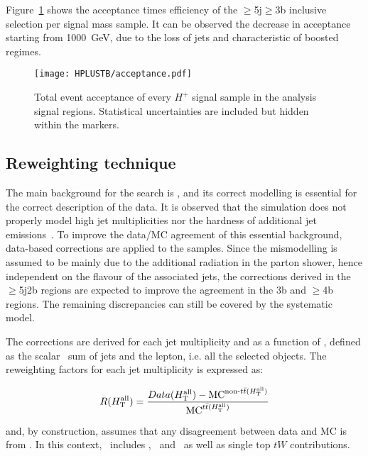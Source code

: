 Figure~\ref{Hplustb:acceptance} shows the acceptance times efficiency of the $\geq$5j$\geq$3b inclusive selection per signal mass sample. It can be observed the decrease in acceptance starting from 1000~GeV, due to the loss of jets and characteristic of boosted regimes.

\begin{figure}[htbp]
    \RawFloats
    \begin{center}
    \texttt{[image: HPLUSTB/acceptance.pdf]}
    \caption{
        Total event acceptance of every $H^+$ signal sample in the analysis signal regions. Statistical uncertainties are included but hidden within the markers.
    }
    \label{Hplustb:acceptance}
    \end{center}
\end{figure}

\clearpage
\subsection{Reweighting technique}
\label{Hplustb:secRW}
The main background for the search is \ttjets, and its correct modelling is essential for the correct description of the data. It is observed that the simulation does not properly model high jet multiplicities nor the hardness of additional jet emissions~\cite{ATL-PHYS-PUB-2018-009,10.1007/JHEP01(2021)033}.
To improve the data/MC agreement of this essential background, data-based corrections are applied to the \ttbar samples. Since the mismodelling is assumed to be mainly due to the additional radiation in the parton shower, hence independent on the flavour of the associated jets, the corrections derived in the $\geq$5j2b regions are expected to improve the agreement in the 3b and $\geq$4b regions. The remaining discrepancies can still be covered by the systematic model.

The corrections are derived for each jet multiplicity and as a function of \HTall, defined as the scalar \pT\ sum of jets and the lepton, i.e. all the selected objects. The reweighting factors for each jet multiplicity is expressed as:

\begin{equation}
    \label{Hplustb:RWeq}
    R(H_{\text{T}}^{\text{all}})=\frac{ Data(H_{\text{T}}^{\text{all}}) - \text{MC}^{\text{non-\ensuremath{t\bar{t}}}(H_{\text{T}}^{\text{all}})} }{\text{MC}^{\text{\ensuremath{t\bar{t}}}(H_{\text{T}}^{\text{all}})}}
\end{equation}

and, by construction, assumes that any disagreement between data and MC is from \ttbar. In this context, \ttbar\ includes \ttb, \ttc\ and \ttl\ as well as single top $tW$ contributions. 

